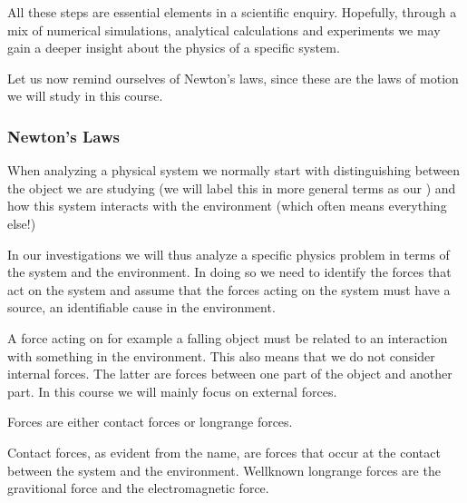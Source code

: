 \documentclass[letterpaper,10pt,english]{sphinxmanual}
\begin{document}
All these steps are essential elements in a scientific
enquiry. Hopefully, through a mix of numerical simulations, analytical
calculations and experiments we may gain a deeper insight about the
physics of a specific system.

Let us now remind ourselves of Newton’s laws, since these are the laws of motion we will study in this course.


\subsubsection{Newton’s Laws}
\label{\detokenize{chapter3:newton-s-laws}}
When analyzing a physical system we normally start with distinguishing between the object we are studying (we will label this in more general terms as our ) and how this system interacts with the environment (which often means everything else!)

In our investigations we will thus analyze a specific physics problem in terms of the system and the environment.
In doing so we need to identify the forces that act on the system and assume that the
forces acting on the system must have a source, an identifiable cause in
the environment.

A force acting on for example a falling object must be related to an interaction with something in the environment.
This also means that we do not consider internal forces. The latter are forces between
one part of the object and another part. In this course we will mainly focus on external forces.

Forces are either contact forces or long\sphinxhyphen{}range forces.

Contact forces, as evident from the name, are forces that occur at the contact between
the system and the environment. Well\sphinxhyphen{}known long\sphinxhyphen{}range forces are the gravitional force and the electromagnetic force.
\end{document}
